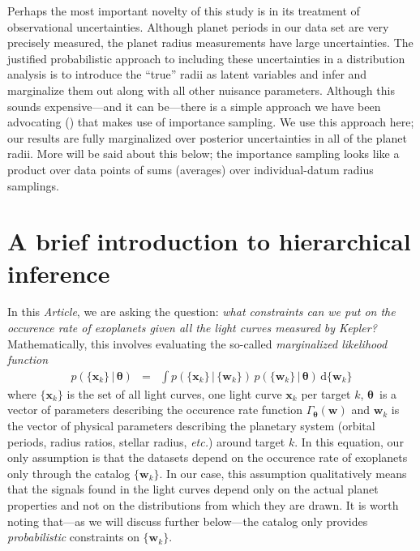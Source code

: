 \documentclass[12pt,preprint]{aastex}
\newcommand{\project}[1]{{\sffamily #1}}
\newcommand{\kepler}{\project{Kepler}}
\newcommand{\paper}{\textsl{Article}}
\newcommand{\foreign}[1]{\emph{#1}}
\newcommand{\etc}{\foreign{etc.}}
\newcommand{\eqlabel}[1]{\label{eq:#1}}
\newcommand{\dd}{\ensuremath{\,\mathrm{d}}}
\newcommand{\bvec}[1]{\ensuremath{\boldsymbol{#1}}}
\newcommand{\rate}{\ensuremath{\Gamma}}
\newcommand{\ratepar}{{\ensuremath{\theta}}}
\newcommand{\ratepars}{{\ensuremath{\bvec{\ratepar}}}}
\newcommand{\data}{{\ensuremath{\bvec{x}}}}
\newcommand{\entry}{{\ensuremath{\bvec{w}}}}
\begin{document}
Perhaps the most important novelty of this study is in its treatment of
observational uncertainties.
Although planet periods in our data set are very precisely measured, the
planet radius measurements have large uncertainties.
The justified probabilistic approach to including these uncertainties in a
distribution analysis is to introduce the ``true'' radii as latent variables
and infer and marginalize them out along with all other nuisance parameters.
Although this sounds expensive---and it can be---there is a simple approach
we have been advocating (\cite{hogge}) that makes use of importance sampling.
We use this approach here; our results are fully marginalized over posterior
uncertainties in all of the planet radii.
More will be said about this below; the importance sampling looks like a
product over data points of sums (averages) over individual-datum radius
samplings.

\section{A brief introduction to hierarchical inference}

In this \paper, we are asking the question: \emph{what constraints can we put
on the occurence rate of exoplanets given all the light curves measured by
\kepler?}
Mathematically, this involves evaluating the so-called \emph{marginalized
likelihood function}
\begin{eqnarray}\eqlabel{crazylike}
p(\{\data_k\}\,|\,\ratepars) &=&
    \int p(\{\data_k\}\,|\,\{\entry_k\})
    \,p(\{\entry_k\}\,|\,\ratepars)
    \dd\{\entry_k\}
\end{eqnarray}
where $\{\data_k\}$ is the set of all light curves, one light curve $\data_k$
per target $k$, \ratepars\ is a vector of parameters describing the occurence
rate function $\rate_\ratepars(\entry)$ and $\entry_k$ is the vector of
physical parameters describing the planetary system (orbital periods,
radius ratios, stellar radius, \etc) around target $k$.
In this equation, our only assumption is that the datasets depend on the
occurence rate of exoplanets only through the catalog $\{\entry_k\}$.
In our case, this assumption qualitatively means that the signals found in the
light curves depend only on the actual planet properties and not on the
distributions from which they are drawn.
It is worth noting that---as we will discuss further below---the catalog only
provides \emph{probabilistic} constraints on $\{\entry_k\}$.
\end{document}
